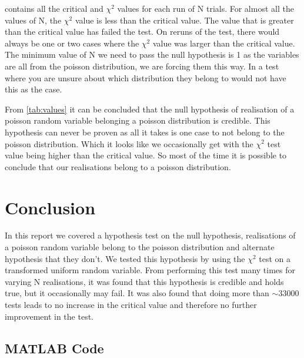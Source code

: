\documentclass[a4paper, 12pt]{article}
\begin{document}
            \par
             contains all the critical and $\chi^2$ values for each run of N trials. For almost all the values of N, the $\chi^2$ value is less than the critical value. The value that is greater than the critical value has failed the test. On reruns of the test, there would always be one or two cases where the $\chi^2$ value was larger than the critical value. The minimum value of N we need to pass the null hypothesis is 1 as the variables are all from the poisson distribution, we are forcing them this way. In a test where you are unsure about which distribution they belong to would not have this as the case.
            \par
            From \cref{tab:values} it can be concluded that the null hypothesis of realisation of a poisson random variable belonging a poisson distribution is credible. This hypothesis can never be proven as all it takes is one case to not belong to the poisson distribution. Which it looks like we occasionally get with the $\chi^2$ test value being higher than the critical value. So most of the time it is possible to conclude that our realisations belong to a poisson distribution.
        
    \section{Conclusion}
        In this report we covered a hypothesis test on the null hypothesis, realisations of a poisson random variable belong to the poisson distribution and alternate hypothesis that they don't. We tested this hypothesis by using the $\chi^2$ test on a transformed uniform random variable. From performing this test many times for varying N realisations, it was found that this hypothesis is credible and holds true, but it occasionally may fail. It was also found that doing more than $\sim 33000$ tests leads to no increase in the critical value and therefore no further improvement in the test.


    \begin{appendices}
        \section{MATLAB Code}
            
    \end{appendices}
\end{document}
